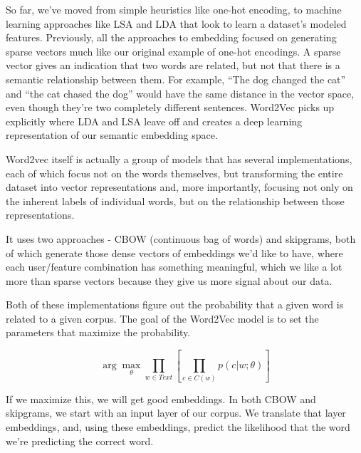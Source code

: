 \documentclass[11pt]{diazessay} %
\begin{document}
So far, we've moved from simple heuristics like one-hot encoding, to machine learning approaches like LSA and LDA that look to learn a dataset's modeled features.  Previously, all the approaches to embedding focused on generating sparse vectors much like our original example of one-hot encodings. A sparse vector gives an indication that two words are related, but not that there is a semantic relationship between them. For example, “The dog changed the cat” and “the cat chased the dog” would have the same distance in the vector space, even though they’re two completely different sentences. Word2Vec picks up explicitly where LDA and LSA leave off and creates a deep learning representation of our semantic embedding space. 

Word2vec itself is actually a group of models that has several implementations, each of which focus not on the words themselves, but transforming the entire dataset into vector representations and, more importantly, focusing  not only on the inherent labels of individual words, but on the relationship between those representations. 
  
It uses two approaches - CBOW (continuous bag of words) and skipgrams, both of which generate those dense vectors of embeddings we'd like to have, where each user/feature combination has something meaningful, which we like a lot more than sparse vectors because they give us more signal about our data. 
 
Both of these implementations figure out the probability that a given word is related to a given corpus. The goal of the Word2Vec model is to set the parameters that maximize the probability\citep{goldberg2014word2vec}. 

\begin{equation}
\arg\max_\theta \prod_{w\in Text}\left[\prod_{c \in C(w)} p(c|w;\theta)\right]
\end{equation}

If we maximize this, we will get good embeddings. In both CBOW and skipgrams, we start with  an input layer of our corpus. We translate that layer embeddings, and, using these embeddings, predict the likelihood that the word we're predicting the correct word. 
 
\def\layersep{2.5cm}
\end{document}
